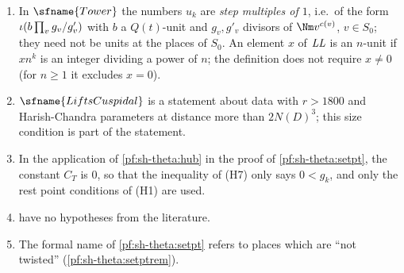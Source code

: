 \begin{remark}\label{pf:sh-theta:rem:form}
\begin{enumerate}[label=(\alph*)]
\item In $\sfname{Tower}$ the numbers $u_k$ are \emph{step multiples of $1$}, i.e.\ of the form $\iota(b\prod_vg_v/g'_v)$ with
$b$ a $Q(t)$-unit and $g_v,g'_v$ divisors of $\Nm v^{c(v)}$, $v\in S_0$; they need not be units at the places of $S_0$. An
element $x$ of $\mathit{LL}$ is an $n$-unit if $xn^k$ is an integer dividing a power of $n$; the definition does not require
$x\ne0$ (for $n\ge1$ it excludes $x=0$).
\item $\sfname{LiftsCuspidal}$ is a statement about data with $r>1800$ and Harish-Chandra parameters at distance more than
$2N(D)^3$; this size condition is part of the statement.
\item In the application of \cref{pf:sh-theta:hub} in the proof of \cref{pf:sh-theta:setpt}, the constant $C_T$ is $0$, so that the
inequality of (H7) only says $0<g_k$, and only the rest point conditions of (H1) are used.
\item {} have no hypotheses from the literature.
\item The formal name of \cref{pf:sh-theta:setpt} refers to places which are ``not twisted'' (\cref{pf:sh-theta:setptrem}).
\end{enumerate}
\end{remark}
